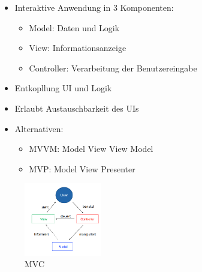 \documentclass[../ZF_SWEN1.tex]{subfiles}
\begin{document}
\begin{multicols}{2}
	\begin{itemize}
		\item Interaktive Anwendung in 3 Komponenten:
		\begin{itemize}
			\item \colorbox{violet!40} {Model:} Daten und Logik
			\item \colorbox{violet!40} {View:} Informationsanzeige
			\item \colorbox{violet!40} {Controller:} Verarbeitung der Benutzereingabe
		\end{itemize}
		\item Entkopllung UI und Logik
		\item Erlaubt Austauschbarkeit des UIs
		\item Alternativen:
		\begin{itemize}
			\item MVVM: Model View View Model
			\item MVP: Model View Presenter
		\end{itemize}
	\end{itemize}
\columnbreak

\begin{figure}[H]			\includegraphics[width=0.3\textwidth] {Resources/Images/MVC.png}
\caption{\label{fig:MVC}MVC}
\end{figure}

\end{multicols}
\end{document}
